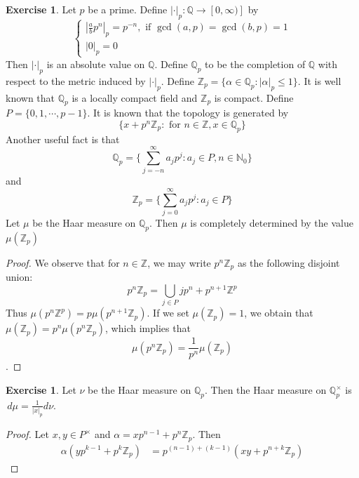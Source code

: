 \documentclass{book}
\theoremstyle{definition}
\newtheorem{ex}[definition]{Exercise}
\newcommand{\al}{\alpha}
\newcommand{\N}{\mathbb{N}}
\newcommand{\Q}{\mathbb{Q}}
\newcommand{\Z}{\mathbb{Z}}
\newcommand{\lex}[1]{\label{ex:#1}}
\DeclareMathOperator*{\0}{\mbf{0}}
\DeclareMathOperator*{\1}{\mbf{1}}
\newcommand{\dmu}{\, d \mu}
\begin{document}
	\begin{ex} \lex{00000} 
		Let $p$ be a prime. Define $|\cdot |_p: \Q \rightarrow [0, \infty)]$ by 
		\[
		\begin{cases}
			|\frac{a}{b}p^n|_p = p^{-n}, \text{ if } \gcd(a,p) = \gcd(b,p) = 1 \\
			|0|_p = 0
		\end{cases}
		\]
		Then $|\cdot|_p$ is an absolute value on $\Q$. Define $\Q_p$ to be the completion of $\Q$ with respect to the metric induced by $|\cdot|_p$. Define $\Z_p = \{\al \in \Q_p: |\al|_p \leq 1 \}$. It is well known that $\Q_p$ is a locally compact field and $\Z_p$ is compact. Define $P = \{0, 1, \cdots, p-1\}$. It is known that the topology is generated by  $$\{x + p^n\Z_p: \text{ for } n \in \Z, x \in \Q_p\}$$ Another useful fact is that $$\Q_p = \{\sum_{j = -n}^{\infty} a_jp^j : a_j \in P, n \in \N_0\}$$ and $$\Z_p = \{\sum_{j = 0}^{\infty} a_jp^j : a_j \in P\}$$ 
		Let $\mu$ be the Haar measure on $\Q_p$. Then $\mu$ is completely determined by the value $\mu(\Z_p)$  
	\end{ex}

	\begin{proof}
		We observe that for $n \in \Z$, we may write $p^n \Z_p$ as the following disjoint union: $$p^n\Z_p = \bigcup\limits_{j \in P} jp^n + p^{n+1}\Z^p$$ Thus $\mu(p^n \Z^{p}) = p \mu(p^{n+1}\Z_p)$. If we set $\mu(\Z_p) = 1$, we obtain that $\mu(\Z_p) = p^n \mu(p^n\Z_p)$, which implies that $$\mu(p^n \Z_p) = \frac{1}{p^n}\mu(\Z_p)$$.  
	\end{proof}
	
	\begin{ex} \lex{00000} 
		Let $\nu$ be the Haar measure on $\Q_p$. Then the Haar measure on $\Q_p^{\times}$  is $\dmu = \frac{1}{|x|_p}d \nu$.
	\end{ex}

	\begin{proof}
		Let $x, y \in P^{\times}$ and $\al = xp^{n-1} + p^n\Z_p$. Then 
		\begin{align*}
			\al (yp^{k-1} + p^k \Z_p) 
			& = p^{(n-1)+ (k-1)}(xy + p^{n+k} \Z_p) 
		\end{align*}
	\end{proof}
	
	
	
	
	
	
	
	
	
	
	
	
	
	
	
\end{document}
